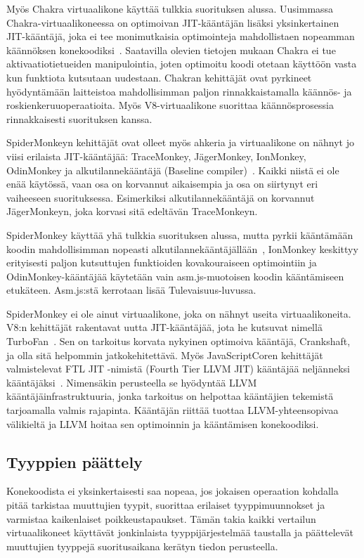 Myös Chakra virtuaalikone käyttää tulkkia suorituksen alussa. Uusimmassa Chakra-virtuaalikoneessa on optimoivan JIT-kääntäjän lisäksi yksinkertainen JIT-kääntäjä, joka ei tee monimutkaisia optimointeja mahdollistaen nopeamman käännöksen konekoodiksi~\cite{chakra}. Saatavilla olevien tietojen mukaan Chakra ei tue aktivaatiotietueiden manipulointia, joten optimoitu koodi otetaan käyttöön vasta kun funktiota kutsutaan uudestaan. Chakran kehittäjät ovat pyrkineet hyödyntämään laitteistoa mahdollisimman paljon rinnakkaistamalla käännös- ja roskienkeruuoperaatioita. Myös V8-virtuaalikone suorittaa käännösprosessia rinnakkaisesti suorituksen kanssa.

SpiderMonkeyn kehittäjät ovat olleet myös ahkeria ja virtuaalikone on nähnyt jo viisi erilaista JIT-kääntäjää: TraceMonkey, JägerMonkey, IonMonkey, OdinMonkey ja alkutilannekääntäjä (Baseline compiler)~\cite{monkeys}. Kaikki niistä ei ole enää käytössä, vaan osa on korvannut aikaisempia ja osa on siirtynyt eri vaiheeseen suorituksessa. Esimerkiksi alkutilannekääntäjä on korvannut JägerMonkeyn, joka korvasi sitä edeltävän TraceMonkeyn.

SpiderMonkey käyttää yhä tulkkia suorituksen alussa, mutta pyrkii kääntämään koodin mahdollisimman nopeasti alkutilannekääntäjällään~\cite{baseline}, IonMonkey keskittyy erityisesti paljon kutsuttujen funktioiden kovakouraiseen optimointiin ja OdinMonkey-kääntäjää käytetään vain asm.js-muotoisen koodin kääntämiseen etukäteen. Asm.js:stä kerrotaan lisää Tulevaisuus-luvussa.

SpiderMonkey ei ole ainut virtuaalikone, joka on nähnyt useita virtuaalikoneita. V8:n kehittäjät rakentavat uutta JIT-kääntäjää, jota he kutsuvat nimellä TurboFan~\cite{turbofan}. Sen on tarkoitus korvata nykyinen optimoiva kääntäjä, Crankshaft, ja olla sitä helpommin jatkokehitettävä. Myös JavaScriptCoren kehittäjät valmistelevat FTL JIT -nimistä (Fourth Tier LLVM JIT) kääntäjää neljänneksi kääntäjäksi~\cite{ftljit}. Nimensäkin perusteella se hyödyntää LLVM kääntäjäinfrastruktuuria, jonka tarkoitus on helpottaa kääntäjien tekemistä tarjoamalla valmis rajapinta. Kääntäjän riittää tuottaa LLVM-yhteensopivaa välikieltä ja LLVM hoitaa sen optimoinnin ja kääntämisen konekoodiksi.

\subsection{Tyyppien päättely}

Konekoodista ei yksinkertaisesti saa nopeaa, jos jokaisen operaation kohdalla pitää tarkistaa muuttujien tyypit, suorittaa erilaiset tyyppimuunnokset ja varmistaa kaikenlaiset poikkeustapaukset. Tämän takia kaikki vertailun virtuaalikoneet käyttävät jonkinlaista tyyppijärjestelmää taustalla ja päättelevät muuttujien tyyppejä suoritusaikana kerätyn tiedon perusteella.

